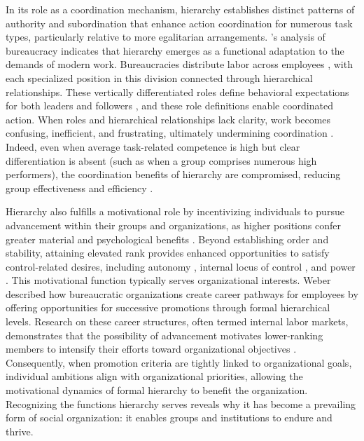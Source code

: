 In its role as a coordination mechanism, hierarchy establishes distinct patterns of authority and subordination that enhance action coordination for numerous task types, particularly relative to more egalitarian arrangements. \citeauthor{Weber-1946-Essays}'s \citeyearpar{Weber-1946-Essays} analysis of bureaucracy indicates that hierarchy emerges as a functional adaptation to the demands of modern work. Bureaucracies distribute labor across employees \citep{Stinchcombe-1974-Industrial}, with each specialized position in this division connected through hierarchical relationships. These vertically differentiated roles define behavioral expectations for both leaders and followers \citep{Biggart-1984-Power, Dornbusch-1975-Authority}, and these role definitions enable coordinated action. When roles and hierarchical relationships lack clarity, work becomes confusing, inefficient, and frustrating, ultimately undermining coordination \citep{Greer-2007-HighPowerTeams, Overbeck-2005Internal}. Indeed, even when average task-related competence is high but clear differentiation is absent (such as when a group comprises numerous high performers), the coordination benefits of hierarchy are compromised, reducing group effectiveness and efficiency \citep{Groysberg-2011-TooManyCooks}.

Hierarchy also fulfills a motivational role by incentivizing individuals to pursue advancement within their groups and organizations, as higher positions confer greater material and psychological benefits \citep{Tannenbaum-1974-Hierarchy}. Beyond establishing order and stability, attaining elevated rank provides enhanced opportunities to satisfy control-related desires, including autonomy \citep{Deci-1987-Support, Porter-1962-JobAttitudes}, internal locus of control \citep{Rotter-1966-GeneralizedExpectancies}, and power \citep{McClelland-1975-Power, Winter-1973-Power}. This motivational function typically serves organizational interests. Weber \citeyearpar{Weber-1946-Essays} described how bureaucratic organizations create career pathways for employees by offering opportunities for successive promotions through formal hierarchical levels. Research on these career structures, often termed internal labor markets, demonstrates that the possibility of advancement motivates lower-ranking members to intensify their efforts toward organizational objectives \citep{Baron-1986-Structure, Pfeffer-1984-Determinants}. Consequently, when promotion criteria are tightly linked to organizational goals, individual ambitions align with organizational priorities, allowing the motivational dynamics of formal hierarchy to benefit the organization. Recognizing the functions hierarchy serves reveals why it has become a prevailing form of social organization: it enables groups and institutions to endure and thrive.

